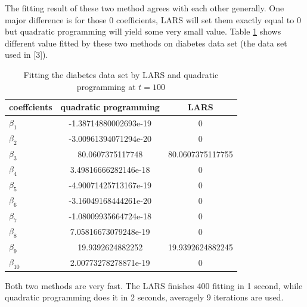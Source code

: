 \documentclass{article} %
\begin{document}
The fitting result of these two method agrees with each other generally. One major difference is for those 0 coefficients, LARS will set them exactly equal to 0 but quadratic programming will yield some very small value. Table \ref{tab1} shows different value fitted by these two methods on diabetes data set (the data set used in [3]).

\begin{table}
	\centering
	\begin{tabular}{|l|c|c|}
		\hline
coeffcients &	quadratic programming & LARS\\
\hline	
$\beta_1$	&	-1.38714880002693e-19& 0\\
$\beta_2$	&	-3.00961394071294e-20&0\\
$\beta_3$	&	80.0607375117748&80.0607375117755\\
$\beta_4$	&	3.49816666282146e-18&0\\
$\beta_5$	&	-4.90071425713167e-19&0\\
$\beta_6$	&	-3.16049168444261e-20&0\\
$\beta_7$	&	-1.08009935664724e-18&0\\
$\beta_8$	&	7.05816673079248e-19&0\\
$\beta_9$	&	19.9392624882252& 19.9392624882245\\
$\beta_{10}$	&	2.00773278278871e-19&0\\
\hline
	\end{tabular}
	\caption{\label{tab1} Fitting the diabetes data set by LARS and quadratic programming  at $t=100$}
\end{table}

Both two methods are very fast. The LARS finishes 400 fitting in 1 second, while quadratic programming does it in 2 seconds, averagely 9 iterations are used.
\end{document}
